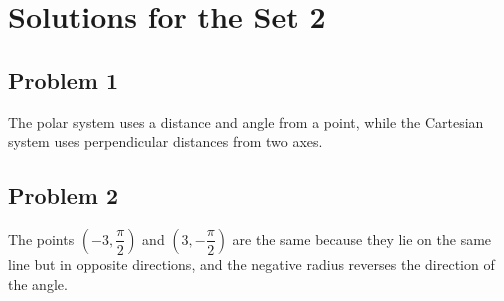 \documentclass[12pt]{article}
\begin{document}
\section*{Solutions for the Set 2}
\subsection*{Problem 1}
The polar system uses a distance and angle from a point, while the Cartesian system uses perpendicular distances from two axes.
\subsection*{Problem 2}
The points \((-3,\dfrac{\pi}{2})\) and \((3,-\dfrac{\pi}{2})\) are the same because they lie on the same line but in opposite directions, and the negative radius reverses the direction of the angle.
\end{document}

